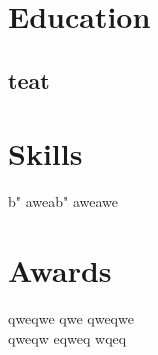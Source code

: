 \documentclass[]{deedy-resume-openfont}
\begin{document}
	\begin{minipage}[t]{0.33\textwidth}

		\section{Education}
		\begin{education}
			\subsection*{teat\\}   
		\end{education}
		\sectionsep


		\section{Skills}
		\begin{skills}
			b " aweab " aweawe
		\end{skills}
		\sectionsep


		\section{Awards}
		\begin{awards}
			qweqwe qwe qweqwe\\qweqw eqweq wqeq\\
		\end{awards}
		\sectionsep

	\end{minipage}
\end{document}
